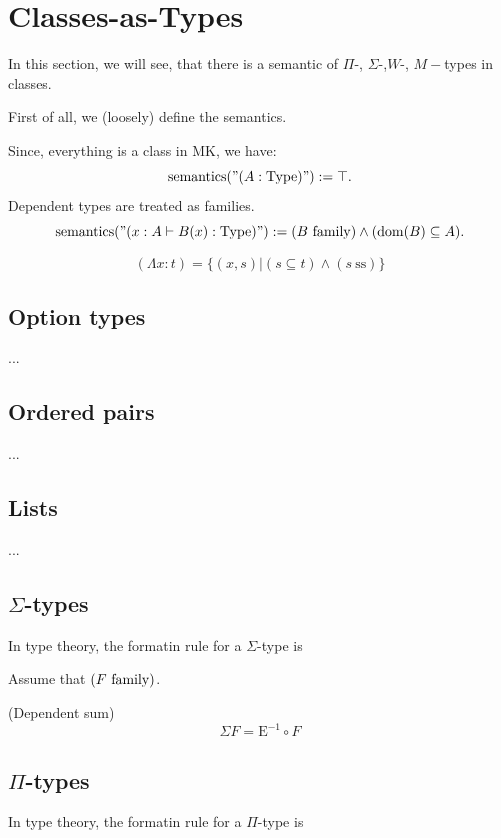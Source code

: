 \def\topic{}

\section{Classes-as-Types}
In this section, we will see, that there is a semantic of $\Pi$-, $\Sigma$-,$W$-, $M-$types in classes.

First of all, we (loosely) define the semantics.

Since, everything is a class in MK, we have:
\[
\mathrm{semantics}("(A:\mathrm{Type})"):=\top.
\]
Dependent types are treated as families.
\[
\mathrm{semantics}("(x:A\vdash B(x):\mathrm{Type})"):=(B\mathrm{\ family})\land(\mathrm{dom}(B)\subseteq A).
\]

\[
(\Lambda x: t) = \{(x,s)|(s\subseteq t)\land (s\ \mbox{ss})\}
\]

\iffalse
Is the following okey ???
\[
(B\family)\iff\exists t : B = (\Lambda x: t) 
\]
\fi
\subsection{Option types}
...\\
\subsection{Ordered pairs}
...\\
\subsection{Lists}
...\\
\subsection{$\Sigma$-types}
In type theory, the formatin rule for a $\Sigma$-type is
\begin{prooftree}
\end{prooftree}

Assume that $(F\mathrm{\ family})$.

\begin{definition}(Dependent sum)
\[
\Sigma F = \mbox{E}^{-1} \circ F
\]
\end{definition}

\subsection{$\Pi$-types}
In type theory, the formatin rule for a $\Pi$-type is
\begin{prooftree}
\end{prooftree}


